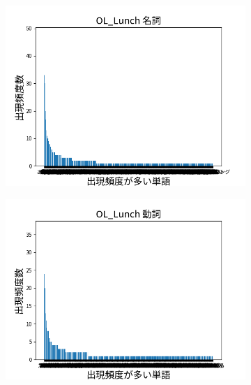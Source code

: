 \documentclass[onecolumn]{ujarticle}   %
\begin{document}
	\begin{figure}[hb]
		\centering
		\begin{subfigure}{0.49\columnwidth}
			\centering
			\includegraphics[width=1.0\columnwidth]{data/meisi_OL_Lunch.png}
		\end{subfigure}
		\begin{subfigure}{0.49\columnwidth}
			\centering
			\includegraphics[width=1.0\columnwidth]{data/dousi_OL_Lunch.png}
		\end{subfigure}
		\begin{subfigure}{0.49\columnwidth}
			\centering

\end{subfigure}
\end{figure}
\end{document}
